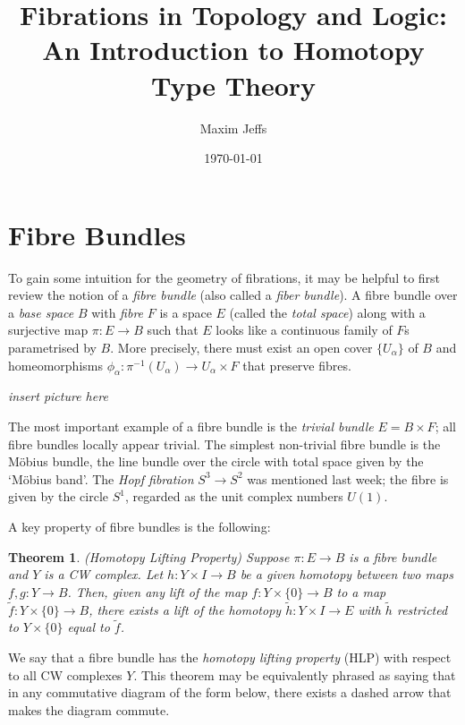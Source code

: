 \documentclass[11pt]{article}
\title{Fibrations in Topology and Logic: An Introduction to Homotopy Type Theory}
\author{Maxim Jeffs}
\date{\today}
\newtheorem{theorem}{Theorem}
\begin{document}
\maketitle

\section*{Fibre Bundles}

To gain some intuition for the geometry of fibrations, it may be helpful to first review the notion of a \textit{fibre bundle} (also called a \textit{fiber bundle}). A fibre bundle over a \textit{base space} $B$ with \textit{fibre} $F$ is a space $E$ (called the \textit{total space}) along with a surjective map $\pi: E \to B$ such that $E$ looks like a continuous family of $F$s parametrised by $B$. More precisely, there must exist an open cover $\{U_{\alpha}\}$ of $B$ and homeomorphisms $\phi_{\alpha} : \pi^{-1}(U_{\alpha}) \to U_{\alpha} \times F$ that preserve fibres. 

\begin{center}
\textit{insert picture here}
\end{center}

The most important example of a fibre bundle is the \textit{trivial bundle} $E = B \times F$; all fibre bundles locally appear trivial. The simplest non-trivial fibre bundle is the M\"obius bundle, the line bundle over the circle with total space given by the `M\"obius band'. The \textit{Hopf fibration} $S^3 \to S^2$ was mentioned last week; the fibre is given by the circle $S^1$, regarded as the unit complex numbers $U(1)$.

A key property of fibre bundles is the following:

\begin{theorem} 
(Homotopy Lifting Property) Suppose $\pi: E \to B$ is a fibre bundle and $Y$ is a CW complex. Let $h: Y \times I \to B$ be a given homotopy between two maps $f,g: Y \to B$. Then, given any lift of the map $f: Y \times \{0\} \to B$ to a map $\tilde{f}: Y \times \{0\} \to B$, there exists a lift of the homotopy $\tilde{h}: Y \times I \to E$ with $\tilde{h}$ restricted to $Y \times \{0\}$ equal to $\tilde{f}$. 
\end{theorem}
We say that a fibre bundle has the \textit{homotopy lifting property} (HLP) with respect to all CW complexes $Y$. This theorem may be equivalently phrased as saying that in any commutative diagram of the form below, there exists a dashed arrow that makes the diagram commute.
\begin{center}
\end{center}
\end{document}
